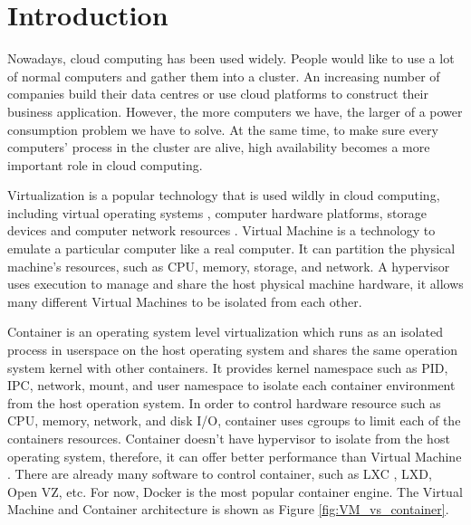 \chapter{Introduction}
\label{chap:intro}
Nowadays, cloud computing \cite{armbrust2010view} has been used widely. People would like to use a lot of normal computers and gather them into a cluster.
An increasing number of companies build their data centres or use cloud platforms to construct their business application.
However, the more computers we have, the larger of a power consumption problem we have to solve. At the same time, to make sure every computers' process in the cluster are alive, high availability \cite{cully2008remus,gray1991high} becomes a more important role in cloud computing.

Virtualization is a popular technology that is used wildly in cloud computing, including virtual operating systems \cite{miller2007virtualization,yan2011development}, computer hardware platforms, storage devices \cite{singh2008server} and computer network resources \cite{chowdhury2010survey}.
Virtual Machine \cite{goldberg1974survey} is a technology to emulate a particular computer like a real computer. It can partition the physical machine's resources, such as CPU, memory, storage, and network.
A hypervisor \cite{younge2011analysis, gavrilovska2007high} uses execution to manage and share the host physical machine hardware, it allows many different Virtual Machines to be isolated from each other.

Container \cite{soltesz2007container} is an operating system level virtualization which runs as an isolated process in userspace on the host operating system and shares the same operation system kernel with other containers.
It provides kernel namespace \cite{biederman2006multiple} such as PID, IPC, network, mount, and user namespace to isolate each container environment from the host operation system.
In order to control hardware resource such as CPU, memory, network, and disk I/O, container uses cgroups to limit each of the containers resources.
Container doesn't have hypervisor to isolate from the host operating system, therefore, it can offer better performance than Virtual Machine \cite{xavier2013performance, dua2014virtualization, joy2015performance}.
There are already many software to control container, such as LXC \cite{helsley2009lxc}, LXD, Open VZ, etc. For now, Docker \cite{merkel2014docker} is the most popular container engine. The Virtual Machine and Container architecture is shown as Figure \ref{fig:VM_vs_container}.

